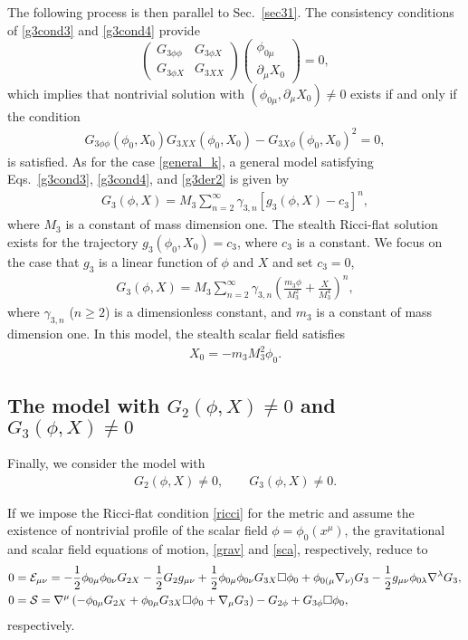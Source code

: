 \documentclass[prd,amsmath,amssymb,floatfix,superscriptaddress,notitlepage,nofootinbib,preprintnumbers]{revtex4-1}
\newcommand{\be}{\begin{equation}}
\newcommand{\ee}{\end{equation}}
\newcommand{\bem}{\begin{pmatrix}}
\newcommand{\eem}{\end{pmatrix}}
\begin{document}
The following process is then parallel to Sec.~\ref{sec31}.
The consistency conditions of \eqref{g3cond3} and \eqref{g3cond4} provide
\be \label{g3cond}
\bem 
G_{3\phi\phi} & G_{3\phi X}\\
G_{3\phi X} & G_{3XX} 
\eem
\bem \phi_{0\mu} \\ \partial_\mu X_{0} \eem
= 0,
\ee
which implies that nontrivial solution with $(\phi_{0\mu},\partial_\mu X_{0})\neq 0$ 
exists if and only if the condition 
\begin{align}
\label{g3der2}
G_{3\phi\phi}(\phi_0,X_0)
G_{3XX} (\phi_0,X_0)
-
G_{3X\phi}(\phi_0,X_0)^2
=0,
\end{align}
is satisfied.
As for the case \eqref{general_k},
a general  model satisfying 
Eqs.~\eqref{g3cond3}, \eqref{g3cond4}, and \eqref{g3der2}
is given by 
\begin{align}
\label{g3gen}
G_3(\phi,X)= 
M_3
\sum_{n=2}^\infty
\gamma_{3,n}
\left[
g_3(\phi,X)
-c_3
\right]^n,
\end{align}
where $M_3$ is a constant of mass dimension one.
The stealth Ricci-flat solution exists for the trajectory $g_3(\phi_0, X_0)=c_3$,
where $c_3$ is a constant.
We focus on the case that $g_3$ is a linear function of $\phi$ and $X$ and set $c_3=0$,
\begin{align}
\label{g3conc}
G_3(\phi,X)= 
M_3
\sum_{n=2}^\infty
\gamma_{3,n}
\left(
\frac{m_3\phi}{M_3^2}
+
\frac{X}{M_3^4}
\right)^n,
\end{align}
where $\gamma_{3,n}$ ($n\geq 2$) is a dimensionless constant,
and $m_3$ is a constant of mass dimension one.
In this model,
the stealth scalar field satisfies
\begin{align}
\label{g3conc2}
X_0=-m_3 M_3^2 \phi_0. 
\end{align}


\subsection{The model with $G_2(\phi,X)\neq 0$ and $G_3(\phi,X)\neq 0$}
\label{sec33}


Finally, we consider the model with 
\begin{align}
\label{general_gg}
G_2(\phi,X)\neq 0,
\qquad
G_3(\phi,X)\neq 0.
\end{align}


If we impose the Ricci-flat condition \eqref{ricci} for the metric
and assume the existence of nontrivial profile of the scalar field $\phi=\phi_0(x^\mu)$,
the gravitational and scalar field equations of motion,
\eqref{grav} and \eqref{sca},
respectively,
reduce to 
\begin{align}
\label{grav2}
0
&={\cal E}_{\mu\nu}
=
-\frac{1}{2}\phi_{0\mu}\phi_{0\nu}G_{2X}
 -\frac{1}{2} G_2 g_{\mu\nu}
 +\frac{1}{2} \phi_{0\mu}\phi_{0\nu} G_{3X}\Box\phi_0
 + \phi_{0(\mu} \nabla_{\nu)} G_3 
 -\frac{1}{2}g_{\mu\nu} \phi_{0\lambda} \nabla^\lambda G_3 ,
\\
\label{sca2}
0
&={\cal S}
=
\nabla^\mu
\left(
 -\phi_{0\mu}G_{2X} 
 +\phi_{0\mu}G_{3X}\Box\phi_0 
 +\nabla_\mu G_3
\right)
- G_{2\phi}
+ G_{3\phi}\Box \phi_{0},
\end{align}
respectively.
\end{document}
